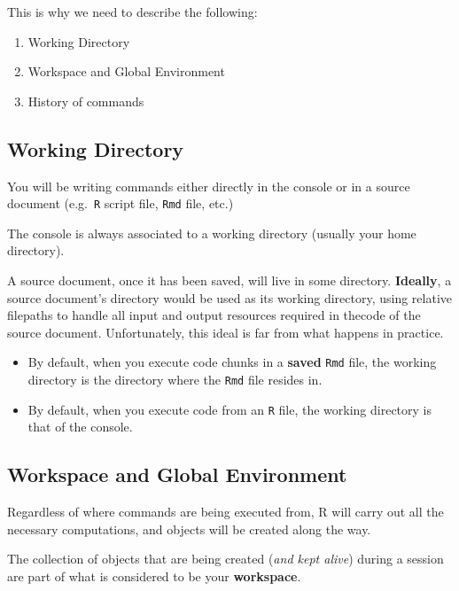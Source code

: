 \documentclass[
]{book}
\begin{document}
This is why we need to describe the following:

\begin{enumerate}
\def\labelenumi{\arabic{enumi}.}
\item
  Working Directory
\item
  Workspace and Global Environment
\item
  History of commands
\end{enumerate}

\hypertarget{working-directory-1}{%
\subsection{Working Directory}\label{working-directory-1}}

You will be writing commands either directly in the console or in a source
document (e.g.~\texttt{R} script file, \texttt{Rmd} file, etc.)

The console is always associated to a working directory (usually your home
directory).

A source document, once it has been saved, will live in some directory.
\textbf{Ideally}, a source document's directory would be used as its working directory,
using relative filepaths to handle all input and output resources required in
thecode of the source document. Unfortunately, this ideal is far from what
happens in practice.

\begin{itemize}
\item
  By default, when you execute code chunks in a \textbf{saved} \texttt{Rmd} file, the
  working directory is the directory where the \texttt{Rmd} file resides in.
\item
  By default, when you execute code from an \texttt{R} file, the working directory
  is that of the console.
\end{itemize}

\hypertarget{workspace-and-global-environment}{%
\subsection{Workspace and Global Environment}\label{workspace-and-global-environment}}

Regardless of where commands are being executed from, R will carry out
all the necessary computations, and objects will be created along the way.

The collection of objects that are being created (\emph{and kept alive}) during a
session are part of what is considered to be your \textbf{workspace}.
\end{document}
